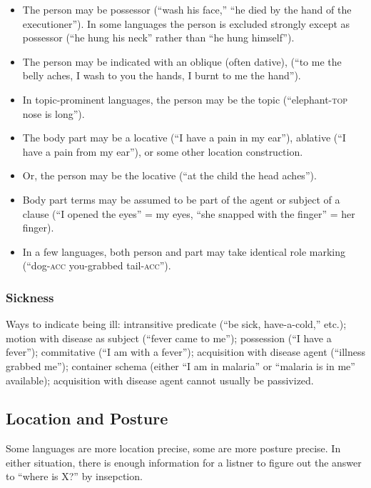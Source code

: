 \documentclass[11pt]{article}
\newcommand{\I}[1]{\textsc{#1}}   %
\newenvironment{grammarlist}%
 {\begin{itemize}\addtolength{\itemsep}{-0.5\baselineskip}\ignorespaces}%
 {\end{itemize}\ignorespacesafterend}
\begin{document}
\begin{grammarlist}
  \item The person may be possessor (``wash his face,'' ``he died by
    the hand of the executioner'').  In some languages the person is
    excluded strongly except as possessor (``he hung his neck'' rather
    than ``he hung himself'').
  \item The person may be indicated with an oblique (often dative),
    (``to me the belly aches, I wash to you the hands, I burnt to me
    the hand'').
  \item In topic-prominent languages, the person may be the topic
    (``elephant-\I{top} nose is long'').
  \item The body part may be a locative (``I have a pain in my ear''),
    ablative (``I have a pain from my ear''), or some other location
    construction.
  \item Or, the person may be the locative (``at the child the head
    aches'').
  \item Body part terms may be assumed to be part of the agent or
    subject of a clause (``I opened the eyes'' = my eyes, ``she
    snapped with the finger'' = her finger).
  \item In a few languages, both person and part may take identical
    role marking (``dog-\I{acc} you-grabbed tail-\I{acc}'').
\end{grammarlist}

\subsubsection{Sickness}
Ways to indicate being ill: intransitive predicate (``be sick,
have-a-cold,'' etc.); motion with disease as subject (``fever came to
me'');  possession (``I have a fever''); commitative (``I am with a
fever''); acquisition with disease agent (``illness grabbed me'');
container schema (either ``I am in malaria'' or ``malaria is in me''
available); acquisition with disease agent cannot usually be
passivized.

\subsection{Location and Posture}
Some languages are more location precise, some are more posture
precise.  In either situation, there is enough information for a
listner to figure out the answer to ``where is X?'' by insepction.
\end{document}

